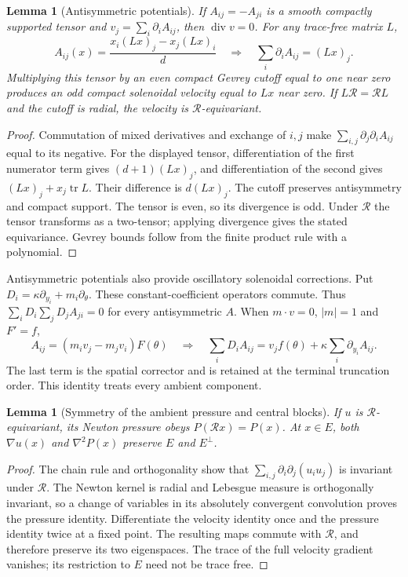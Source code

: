\documentclass[11pt]{article}
\newtheorem{lemma}[theorem]{Lemma}
\theoremstyle{definition}
\begin{document}
\begin{lemma}[Antisymmetric potentials]\label{lem:potential}
If $A_{ij}=-A_{ji}$ is a smooth compactly supported tensor and
$v_j=\sum_i\partial_iA_{ij}$, then $\operatorname{div}v=0$.
For any trace-free matrix $L$,
\[
 A_{ij}(x)=\frac{x_i(Lx)_j-x_j(Lx)_i}{d}
 \quad\Longrightarrow\quad \sum_i\partial_i A_{ij}=(Lx)_j.
\]
Multiplying this tensor by an even compact Gevrey cutoff equal to one
near zero produces an odd compact solenoidal velocity equal to $Lx$
near zero. If $L\mathcal R=\mathcal R L$ and the cutoff is radial, the
velocity is $\mathcal R$-equivariant.
\end{lemma}
\begin{proof}
Commutation of mixed derivatives and exchange of $i,j$ make
$\sum_{i,j}\partial_j\partial_iA_{ij}$ equal to its negative.
For the displayed tensor, differentiation of the first numerator term
gives $(d+1)(Lx)_j$, and differentiation of the second gives
$(Lx)_j+x_j\operatorname{tr}L$. Their difference is $d(Lx)_j$.
The cutoff preserves antisymmetry and compact support. The tensor is
even, so its divergence is odd. Under $\mathcal R$ the tensor transforms
as a two-tensor; applying divergence gives the stated equivariance.
Gevrey bounds follow from the finite product rule with a polynomial.
\end{proof}

Antisymmetric potentials also provide oscillatory solenoidal
corrections. Put $D_i=\kappa\partial_{y_i}+m_i\partial_\theta$.
These constant-coefficient operators commute. Thus
$\sum_iD_i\sum_jD_j A_{ji}=0$ for every antisymmetric $A$.
When $m\cdot v=0$, $|m|=1$ and $F'=f$,
\[
 A_{ij}=(m_i v_j-m_j v_i)F(\theta)
 \quad\Longrightarrow\quad
 \sum_iD_i A_{ij}=v_jf(\theta)+\kappa\sum_i\partial_{y_i}A_{ij}.
\]
The last term is the spatial corrector and is retained at the
terminal truncation order. This identity treats every ambient component.

\begin{lemma}[Symmetry of the ambient pressure and central blocks]\label{lem:reflection}
If $u$ is $\mathcal R$-equivariant, its Newton pressure obeys
$P(\mathcal R x)=P(x)$. At $x\in E$, both $\nabla u(x)$ and
$\nabla^2P(x)$ preserve $E$ and $E^\perp$.
\end{lemma}
\begin{proof}
The chain rule and orthogonality show that
$\sum_{i,j}\partial_i\partial_j(u_i u_j)$ is invariant under
$\mathcal R$. The Newton kernel is radial and Lebesgue measure is
orthogonally invariant, so a change of variables in its absolutely
convergent convolution proves the pressure identity. Differentiate the
velocity identity once and the pressure identity twice at a fixed point.
The resulting maps commute with $\mathcal R$, and therefore preserve its
two eigenspaces. The trace of the full velocity gradient vanishes; its restriction to
$E$ need not be trace free.
\end{proof}
\end{document}
